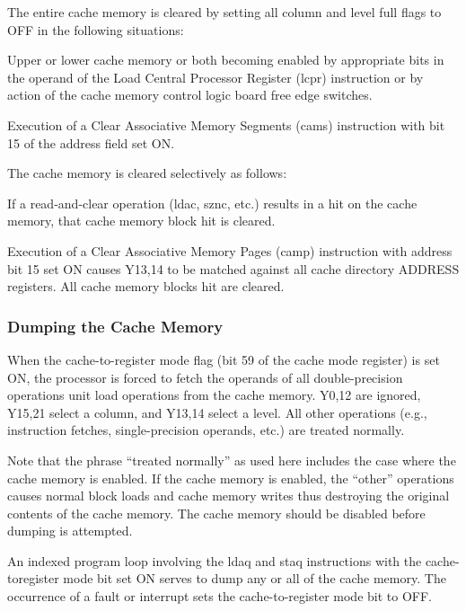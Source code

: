 
The entire cache memory is cleared by setting all column and level full flags
to OFF in the following situations:

Upper or lower cache memory or both becoming enabled by appropriate bits in the
operand of the Load Central Processor Register (lcpr) instruction or by action
of the cache memory control logic board free edge switches.  

Execution of a Clear Associative Memory Segments (cams) instruction with bit 15
of the address field set ON.


The cache memory is cleared selectively as follows:

If a read-and-clear operation (ldac, sznc, etc.) results in a hit on the cache
memory, that cache memory block hit is cleared.

Execution of a Clear Associative Memory Pages (camp) instruction with address
bit 15 set ON causes Y13,14 to be matched against all cache directory ADDRESS
registers.  All cache memory blocks hit are cleared.

\subsubsection{Dumping the Cache Memory}

When the cache-to-register mode flag (bit 59 of the cache mode register) is set
ON, the processor is forced to fetch the operands of all double-precision
operations unit load operations from the cache memory. Y0,12 are ignored,
Y15,21 select a column, and Y13,14 select a level. All other operations (e.g.,
instruction fetches, single-precision operands, etc.) are treated normally.

Note that the phrase {``}treated normally'' as used here includes the case
where the cache memory is enabled. If the cache memory is enabled, the
{``}other'' operations causes normal block loads and cache memory writes thus
destroying the original contents of the cache memory. The cache memory should
be disabled before dumping is attempted.

An indexed program loop involving the ldaq and staq instructions with the
cache-toregister mode bit set ON serves to dump any or all of the cache memory.  
The occurrence of a fault or interrupt sets the cache-to-register mode bit to
OFF.  




